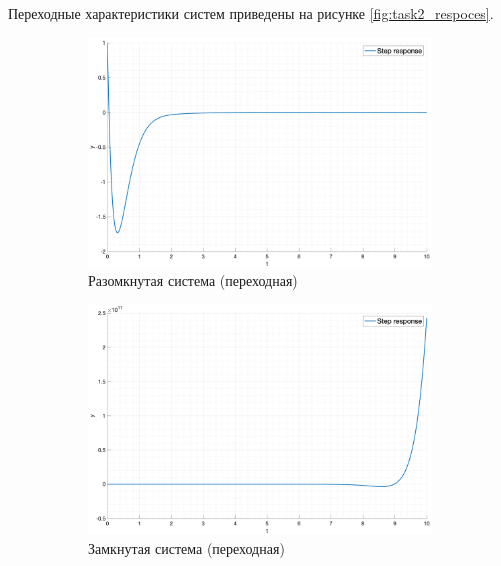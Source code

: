 Переходные характеристики систем приведены на рисунке \ref{fig:task2_respoces}.
\begin{figure}[ht!]
    \centering
    \begin{subfigure}{0.5\textwidth}
        \includegraphics[width=\textwidth]{media/plots/task2_step_response_open.png}
        \caption{Разомкнутая система (переходная)}
        \label{fig:task2_step:open}
    \end{subfigure}%
    \begin{subfigure}{0.5\textwidth}
        \includegraphics[width=\textwidth]{media/plots/task2_step_response_closed.png}
        \caption{Замкнутая система (переходная)}
        \label{fig:task2_step:closed}
    \end{subfigure}
    \begin{subfigure}{0.5\textwidth}

\end{subfigure}
\end{figure}
